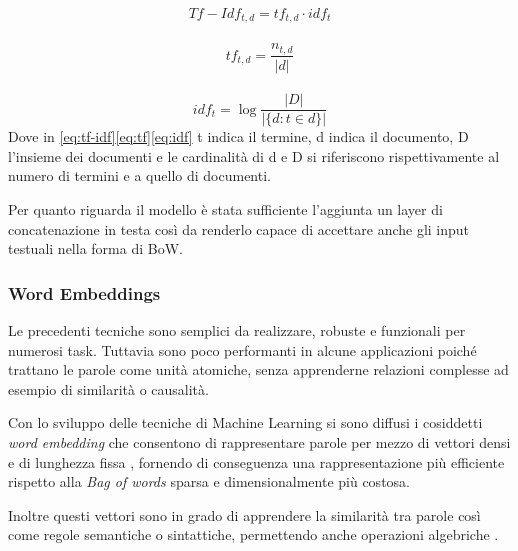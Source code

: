 \begin{equation}
\label{eq:tf-idf}
   Tf-Idf_{t,d} = tf_{t,d} \cdot idf_t
\end{equation}
\\
\begin{equation}
\label{eq:tf}
   tf_{t,d} = \frac{n_{t,d}}{|d|} 
\end{equation}
\\
\begin{equation}
\label{eq:idf}
   idf_{t} = \log \frac{|D|}{|\{d: t \in d\}|} 
\end{equation}
Dove in \eqref{eq:tf-idf}\eqref{eq:tf}\eqref{eq:idf} t indica il termine, d
indica il documento, D l'insieme dei documenti e le cardinalità di d e D si
riferiscono rispettivamente al numero di termini e a quello di documenti.



Per quanto riguarda il modello è stata sufficiente l'aggiunta un layer di
concatenazione in testa così da renderlo capace di accettare anche gli input
testuali nella forma di BoW.


\subsubsection{Word Embeddings}

Le precedenti tecniche sono semplici da realizzare, robuste e funzionali per
numerosi task. Tuttavia sono poco performanti in alcune applicazioni poiché
trattano le parole come unità atomiche, senza apprenderne relazioni complesse
ad esempio di similarità o causalità.

Con lo sviluppo delle tecniche di Machine Learning si sono diffusi i cosiddetti
\textit{word embedding} che consentono di rappresentare parole per mezzo di
vettori densi e di lunghezza fissa \cite{almeida2019word}, fornendo di
conseguenza una rappresentazione più efficiente rispetto alla \textit{Bag of
words} sparsa e dimensionalmente più costosa.

Inoltre questi vettori sono in grado di apprendere la similarità tra parole così
come regole semantiche o sintattiche, permettendo anche operazioni algebriche
\cite{mikolov2013efficient}.

